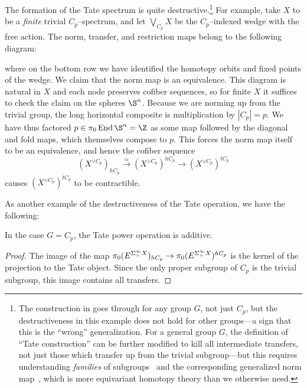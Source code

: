 \begin{example}\label{TateDestruction}
The formation of the Tate spectrum is quite destructive.\footnote{The construction in  goes through for any group \(G\), not just \(C_p\), but the destructiveness in this example does not hold for other groups---a sign that this is the ``wrong'' generalization.  For a general group \(G\), the definition of ``Tate construction'' can be further modified to kill all intermediate transfers, not just those which transfer up from the trivial subgroup---but this requires understanding \textit{families} of subgroups~\cite[Section XXI.4]{MayAlaskaNotes} and the corresponding generalized norm map~\cite[Section XXV.6]{MayAlaskaNotes}, which is more equivariant homotopy theory than we otherwise need.}  For example, take \(X\) to be a \emph{finite} trivial \(C_p\)--spectrum, and let \(\bigvee_{C_p} X\) be the \(C_p\)--indexed wedge with the free action.  The norm, transfer, and restriction maps belong to the following diagram:
\begin{center}
\end{center}
where on the bottom row we have identified the homotopy orbits and fixed points of the wedge.  We claim that the norm map is an equivalence.  This diagram is natural in \(X\) and each node preserves cofiber sequences, so for finite \(X\) it suffices to check the claim on the spheres \(\S^n\).  Because we are norming up from the trivial group, the long horizontal composite is multiplication by \(|C_p| = p\).  We have thus factored \(p \in \pi_0 \End \S^n = \Z\) as some map followed by the diagonal and fold maps, which themselves compose to \(p\).  This forces the norm map itself to be an equivalence, and hence the cofiber sequence \[(X^{\vee C_p})_{hC_p} \xrightarrow{\simeq} (X^{\vee C_p})^{hC_p} \to (X^{\vee C_p})^{tC_p}\] causes \((X^{\vee C_p})^{tC_p}\) to be contractible.
\end{example}

As another example of the destructiveness of the Tate operation, we have the following:

\begin{lemma}
In the case \(G = C_p\), the Tate power operation is additive.
\end{lemma}
\begin{proof}
The image of the map \(\pi_0 (E^{\Sigma^\infty_+ X})_{hC_p} \to \pi_0 (E^{\Sigma^\infty_+ X})^{hC_p}\) is the kernel of the projection to the Tate object.  Since the only proper subgroup of \(C_p\) is the trivial subgroup, this image contains all transfers.
\end{proof}

